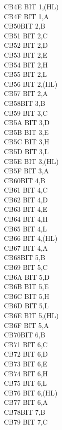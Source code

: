 \documentclass[12pt,twoside,openright,a4paper]{book}
\begin{document}
\begin{multicols}{3}
{\begin{tabbing}
	CB4E\> 	BIT 1,(HL)\\
	CB4F\> 	BIT 1,A\\
	CB50\>BIT 2,B\\
	CB51\> 	BIT 2,C\\
	CB52\> 	BIT 2,D\\
	CB53\> 	BIT 2,E\\
	CB54\> 	BIT 2,H\\
	CB55\> 	BIT 2,L\\
	CB56\> 	BIT 2,(HL)\\
	CB57\> 	BIT 2,A\\
	CB58\>BIT 3,B\\
	CB59\> 	BIT 3,C\\
	CB5A\> 	BIT 3,D\\
	CB5B\> 	BIT 3,E\\
	CB5C\> 	BIT 3,H\\
	CB5D\> 	BIT 3,L\\
	CB5E\> 	BIT 3,(HL)\\
	CB5F\> 	BIT 3,A\\
	CB60\>BIT 4,B\\
	CB61\> 	BIT 4,C\\
	CB62\> 	BIT 4,D\\
	CB63\> 	BIT 4,E\\
	CB64\> 	BIT 4,H\\
	CB65\> 	BIT 4,L\\
	CB66\> 	BIT 4,(HL)\\
	CB67\> 	BIT 4,A\\
	CB68\>BIT 5,B\\
	CB69\> 	BIT 5,C\\
	CB6A\> 	BIT 5,D\\
	CB6B\> 	BIT 5,E\\
	CB6C\> 	BIT 5,H\\
	CB6D\> 	BIT 5,L\\
	CB6E\> 	BIT 5,(HL)\\
	CB6F\> 	BIT 5,A\\
	CB70\>BIT 6,B\\
	CB71\> 	BIT 6,C\\
	CB72\> 	BIT 6,D\\
	CB73\> 	BIT 6,E\\
	CB74\> 	BIT 6,H\\
	CB75\> 	BIT 6,L\\
	CB76\> 	BIT 6,(HL)\\
	CB77\> 	BIT 6,A\\
	CB78\>BIT 7,B\\
	CB79\> 	BIT 7,C\\

\end{tabbing}}
\end{multicols}
\end{document}
